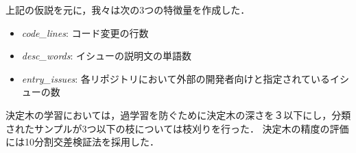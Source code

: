 
上記の仮説を元に，我々は次の3つの特徴量を作成した．


\begin{itemize}
  \item \textit{code\_lines}: コード変更の行数
  \item \textit{desc\_words}: イシューの説明文の単語数
  \item \textit{entry\_issues}: 各リポジトリにおいて外部の開発者向けと指定されているイシューの数
\end{itemize}



決定木の学習においては，過学習を防ぐために決定木の深さを３以下にし，分類されたサンプルが3つ以下の枝については枝刈りを行った．
決定木の精度の評価には10分割交差検証法を採用した．




